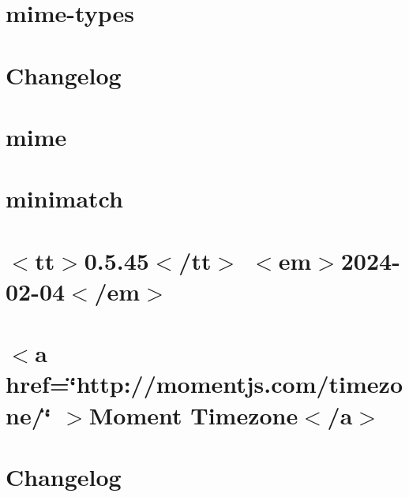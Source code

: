 \documentclass[twoside]{book}
\newcommand{\+}{\discretionary{\mbox{\scriptsize$\hookleftarrow$}}{}{}}
\begin{document}
\chapter{mime-\/types}
\label{md_src_nodejs_node_modules_mime_types_README}

\chapter{Changelog}
\label{md_src_nodejs_node_modules_mime_CHANGELOG}

\chapter{mime}
\label{md_src_nodejs_node_modules_mime_README}

\chapter{minimatch}
\label{md_src_nodejs_node_modules_minimatch_README}

\chapter{\texorpdfstring{$<$}{<}tt\texorpdfstring{$>$}{>}0.5.45\texorpdfstring{$<$}{<}/tt\texorpdfstring{$>$}{>} \texorpdfstring{$<$}{<}em\texorpdfstring{$>$}{>}2024-\/02-\/04\texorpdfstring{$<$}{<}/em\texorpdfstring{$>$}{>}}
\label{md_src_nodejs_node_modules_moment_timezone_changelog}

\chapter{\texorpdfstring{$<$}{<}a href=\char`\"{}http\+://momentjs.\+com/timezone/\char`\"{} \texorpdfstring{$>$}{>}Moment Timezone\texorpdfstring{$<$}{<}/a\texorpdfstring{$>$}{>}}
\label{md_src_nodejs_node_modules_moment_timezone_README}

\chapter{Changelog}
\label{md_src_nodejs_node_modules_moment_CHANGELOG}

\end{document}
